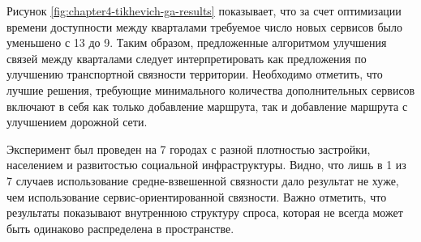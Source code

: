 Рисунок \ref{fig:chapter4-tikhevich-ga-results} показывает, что за счет оптимизации времени доступности между кварталами требуемое число новых сервисов было уменьшено с 13 до 9. Таким образом, предложенные алгоритмом улучшения связей между кварталами следует интерпретировать как предложения по улучшению транспортной связности территории. Необходимо отметить, что лучшие решения, требующие минимального количества дополнительных сервисов включают в себя как только добавление маршрута, так и добавление маршрута с улучшением дорожной сети.

Эксперимент был проведен на 7 городах с разной плотностью застройки, населением и развитостью социальной инфраструктуры. Видно, что лишь в 1 из 7 случаев использование средне-взвешенной связности дало результат не хуже, чем использование сервис-ориентированной связности. Важно отметить, что результаты показывают внутреннюю структуру спроса, которая не всегда может быть одинаково распределена в пространстве.
